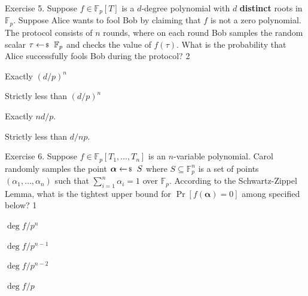 \documentclass[../../book.tex]{subfiles}
\begin{document}
\begin{xexercise}
    {Exercise 5.} { Suppose $f \in \mathbb{F}_p[T]$ is a $d$-degree polynomial
    with $d$ \textbf{distinct} roots in $\mathbb{F}_p$. Suppose Alice wants to
    fool Bob by claiming that $f$ is not a zero polynomial. The protocol
    consists of $n$ rounds, where on each round Bob samples the random scalar
    $\tau \leftarrowS \mathbb{F}_p$ and checks the value of $f(\tau)$. What
    is the probability that Alice successfully fools Bob during the protocol?}
    {2} {
        \item Exactly $(d/p)^n$
        \item Strictly less than $(d/p)^n$
        \item Exactly $nd/p$.
        \item Strictly less than $d/np$.
    }
\end{xexercise}

\begin{xexercise}
    {Exercise 6.} { Suppose $f \in \mathbb{F}_p[T_1,\dots,T_n]$ is an
    $n$-variable polynomial. Carol randomly samples the point $\bm{\alpha}
    \leftarrowS S$ where $S \subseteq \mathbb{F}_p^n$ is a
    set of points $(\alpha_1,\dots,\alpha_n)$ such that $\sum_{i=1}^n \alpha_i=1$ over
    $\mathbb{F}_p$. According to the Schwartz-Zippel Lemma, what is the tightest
    upper bound for $\Pr[f(\bm{\alpha})=0]$ among specified below?}
    {1} {
        \item $\deg f/p^n$
        \item $\deg f/p^{n-1}$
        \item $\deg f/p^{n-2}$
        \item $\deg f/p$
    }
\end{xexercise}
\end{document}
